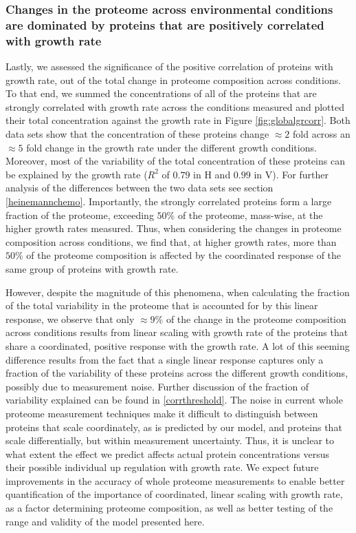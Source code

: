 \subsubsection{Changes in the proteome across environmental conditions are dominated by proteins that are positively correlated with growth rate}
Lastly, we assessed the significance of the positive correlation of proteins with growth rate, out of the total change in proteome composition across conditions.
To that end, we summed the concentrations of all of the proteins that are strongly correlated with growth rate across the conditions measured and plotted their total concentration against the growth rate in Figure \ref{fig:globalgrcorr}.
Both data sets show that the concentration of these proteins change $\approx 2$ fold across an $\approx 5$ fold change in the growth rate under the different growth conditions.
Moreover, most of the variability of the total concentration of these proteins can be explained by the growth rate ($R^2$ of $0.79$ in H and $0.99$ in V). 
For further analysis of the differences between the two data sets see section \ref{heinemannchemo}.
Importantly, the strongly correlated proteins form a large fraction of the proteome, exceeding $50\%$ of the proteome, mass-wise, at the higher growth rates measured.
Thus, when considering the changes in proteome composition across conditions, we find that, at higher growth rates, more than $50\%$ of the proteome composition is affected by the coordinated response of the same group of proteins with growth rate.

However, despite the magnitude of this phenomena, when calculating the fraction of the total variability in the proteome that is accounted for by this linear response, we observe that only $\approx 9\%$ of the change in the proteome composition across conditions results from linear scaling with growth rate of the proteins that share a coordinated, positive response with the growth rate.
A lot of this seeming difference results from the fact that a single linear response captures only a fraction of the variability of these proteins across the different growth conditions, possibly due to measurement noise.
Further discussion of the fraction of variability explained can be found in \ref{corrthreshold}.
The noise in current whole proteome measurement techniques make it difficult to distinguish between proteins that scale coordinately, as is predicted by our model, and proteins that scale differentially, but within measurement uncertainty.
Thus, it is unclear to what extent the effect we predict affects actual protein concentrations versus their possible individual up regulation with growth rate.
We expect future improvements in the accuracy of whole proteome measurements to enable better quantification of the importance of coordinated, linear scaling with growth rate, as a factor determining proteome composition, as well as better testing of the range and validity of the model presented here.